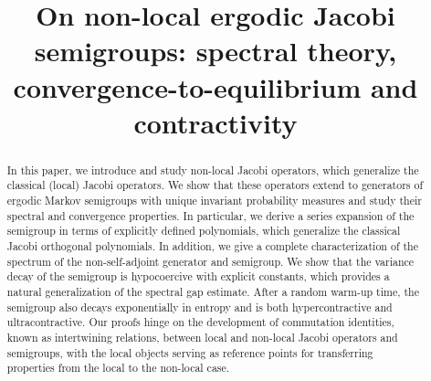 \documentclass[JEP,XML,SOM,Unicode]{cedram}
\theoremstyle{plain}
\theoremstyle{definition}
\begin{document}
\title[On non-local ergodic Jacobi semigroups]{On non-local ergodic Jacobi semigroups: spectral theory, convergence-to-equilibrium and contractivity}

\author[\initial{P.} \lastname{Cheridito}]{ }
\address{Department of Mathematics, ETH Zurich\\
Rämistrasse 101, 8092 Zurich, Switzerland}

\author[\initial{P.} \lastname{Patie}]{ }
\address{School of Operations Research and Information Engineering, Cornell University\\
Ithaca, NY 14853, USA}

\author[\initial{A.} \lastname{Srapionyan}]{ }
\address{Center for Applied Mathematics, Cornell University\\
Ithaca, NY 14853, USA}
\urladdr{}

\author[\initial{A.} \lastname{Vaidyanathan}]{ }
\address{Center for Applied Mathematics, Cornell University\\
Ithaca, NY 14853, USA}
\urladdr{}



\begin{abstract}
In this paper, we introduce and study non-local Jacobi operators, which generalize the classical (local) Jacobi operators. We show that these operators extend to generators of ergodic Markov semigroups with unique invariant probability measures and study their spectral and convergence properties. In particular, we derive a series expansion of the semigroup in terms of explicitly defined polynomials, which generalize the classical Jacobi orthogonal polynomials. In addition, we give a complete characterization of the spectrum of the non-self-adjoint generator and semigroup. We show that the variance decay of the semigroup is hypocoercive with explicit constants, which provides a natural generalization of the spectral gap estimate. After a random warm-up time, the semigroup also decays exponentially in entropy and is both hypercontractive and ultracontractive. Our proofs hinge on the development of commutation identities, known as intertwining relations, between local and non-local Jacobi operators and semigroups, with the local objects serving as reference points for transferring properties
from the local to the non-local case.
\end{abstract}
\end{document}
